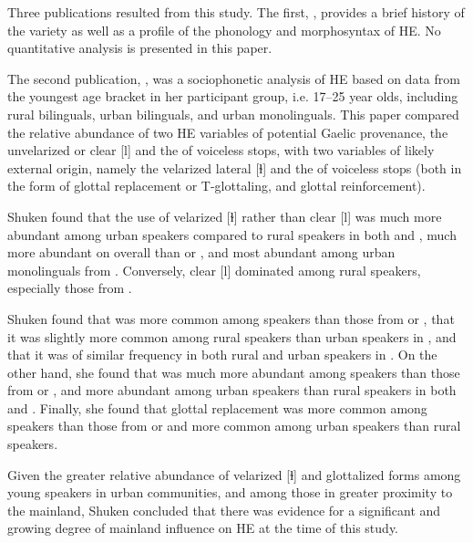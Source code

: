 \documentclass[output=paper,colorlinks,citecolor=brown]{langscibook}
\begin{document}
Three publications resulted from this study. The first, \citet{Shuken:1984}, provides a brief history of the variety as well as a profile of the phonology and morphosyntax of HE. No quantitative analysis is presented in this paper. 

The second publication, \citet{Shuken:1985}, was a sociophonetic analysis of HE based on data from the youngest age bracket in her participant group, i.e. 17--25 year olds, including rural bilinguals, urban bilinguals, and urban monolinguals. This paper compared the relative abundance of two HE variables of potential Gaelic provenance, the unvelarized or clear [l] and the  of voiceless stops, with two variables of likely external origin, namely the velarized lateral [ɫ] and the  of voiceless stops (both in the form of glottal replacement or T-glottaling, and glottal reinforcement). 

Shuken found that the use of velarized [ɫ] rather than clear [l] was much more abundant among urban speakers compared to rural speakers in both  and , much more abundant on  overall than  or , and most abundant among urban monolinguals from . Conversely, clear [l] dominated among rural speakers, especially those from .

Shuken found that  was more common among  speakers than those from  or , that it was slightly more common among rural speakers than urban speakers in , and that it was of similar frequency in both rural and urban speakers in . On the other hand, she found that  was much more abundant among  speakers than those from  or , and more abundant among urban speakers than rural speakers in both  and . Finally, she found that glottal replacement was more common among  speakers than those from  or  and more common among urban speakers than rural speakers. 

Given the greater relative abundance of velarized [ɫ] and glottalized forms among young speakers in urban communities, and among those in greater proximity to the mainland, Shuken concluded that there was evidence for a significant and growing degree of mainland influence on HE at the time of this study. 
\end{document}
